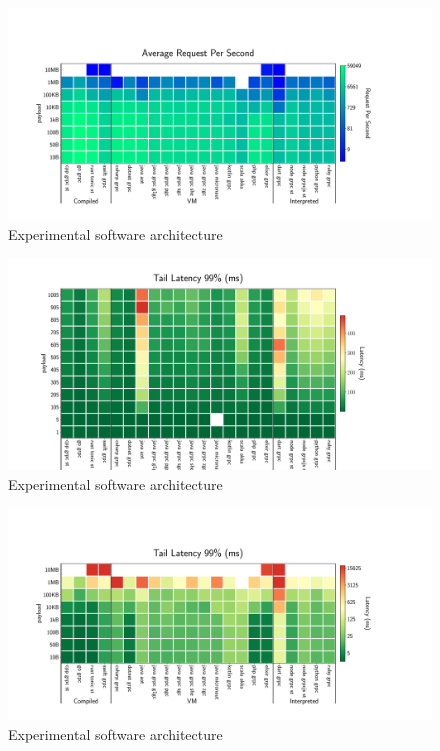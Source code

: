 \begin{figure}[!hbt]
    \begin{center}
        \includegraphics[width=1.2\linewidth]{imgs/rpc_images/rps_payload}
    \end{center}
    \caption{Experimental software architecture}\label{fig:rps_payload}
\end{figure}



\begin{figure}[!hbt]
    \begin{center}
        \includegraphics[width=1.2\linewidth]{imgs/rpc_images/tail99_clients}
    \end{center}
    \caption{Experimental software architecture}\label{fig:tail99_clients}
\end{figure}


\begin{figure}[!hbt]
    \begin{center}
        \includegraphics[width=1.2\linewidth]{imgs/rpc_images/tail99_payload}
    \end{center}
    \caption{Experimental software architecture}\label{fig:tail99_payload}
\end{figure}


